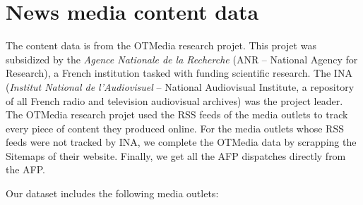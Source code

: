 \clearpage 
\pagebreak


\section{News media content data\label{Sec:OA_Content}}

The content data is from the OTMedia research projet. This projet was subsidized by the \textit{Agence Nationale de la Recherche} (ANR -- National Agency for Research), a French institution tasked with funding scientific research. The INA (\textit{Institut National de l'Audiovisuel} -- National Audiovisual Institute, a repository of all French radio and television audiovisual archives) was the project leader. The OTMedia research projet used the RSS feeds of the media outlets to track every piece of content they produced online. For the media outlets whose RSS feeds were not tracked by INA, we complete the OTMedia data by scrapping the Sitemaps of their website. Finally, we get all the AFP dispatches directly from the AFP.

Our dataset includes the following media outlets:


